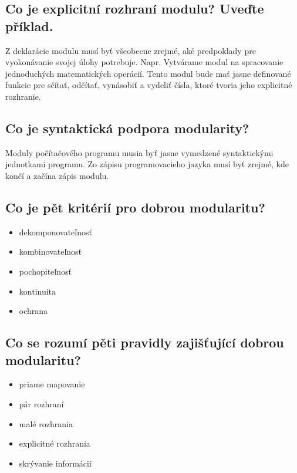 \subsection{Co je explicitní rozhraní modulu? Uveďte příklad.}
Z deklarácie modulu musí byť všeobecne zrejmé, aké predpoklady pre vyokonávanie svojej úlohy potrebuje. \newline
Napr. Vytvárame modul na spracovanie jednoduchých matematických operácií. Tento modul bude mať jasne definované funkcie pre sčítať, odčítať, vynásobiť a vydeliť čísla, ktoré tvoria jeho explicitné rozhranie.


\subsection{Co je syntaktická podpora modularity?}
Moduly počítačového programu musia byť jasne vymedzené syntaktickými jednotkami programu.
Zo zápisu programovacieho jazyka musí byť zrejmé, kde končí a začína zápis modulu.


\subsection{Co je pět kritérií pro dobrou modularitu?}
\begin{itemize}
    \item dekomponovateľnosť
    \item kombinovateľnosť
    \item pochopiteľnosť
    \item kontinuita
    \item ochrana
\end{itemize}


\subsection{Co se rozumí pěti pravidly zajišťující dobrou modularitu?}
\begin{itemize}
    \item priame mapovanie
    \item pár rozhraní
    \item malé rozhrania
    \item explicitné rozhrania
    \item skrývanie informácií
\end{itemize}


